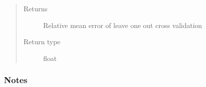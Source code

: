 \documentclass[letterpaper,10pt,english,openany,oneside]{sphinxmanual}
\begin{document}
\begin{fulllineitems}
\begin{fulllineitems}
\begin{quote}
\begin{description}
\begin{itemize}
\end{itemize}

\item[{Returns}] \leavevmode
{} \textendash{} Relative mean error of leave one out cross validation

\item[{Return type}] \leavevmode
float

\end{description}\end{quote}
\subsubsection*{Notes}

\end{fulllineitems}


\end{fulllineitems}

\end{document}
